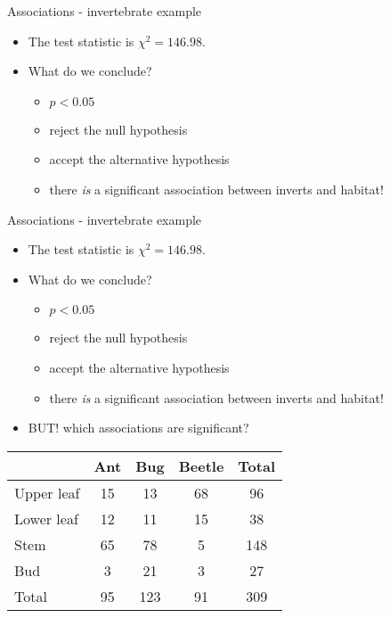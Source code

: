 \documentclass[
  ignorenonframetext,
  t]{beamer}
\providecommand{\tightlist}{%
  \setlength{\itemsep}{0pt}\setlength{\parskip}{0pt}}
\begin{document}
\begin{frame}{Associations - invertebrate example}
\protect\hypertarget{associations---invertebrate-example-7}{}

\begin{itemize}
\tightlist
\item
  The test statistic is \(\chi^2 = 146.98\).
\item
  What do we conclude?

  \begin{itemize}
  \tightlist
  \item
    \(p < 0.05\)
  \item
    reject the null hypothesis
  \item
    accept the alternative hypothesis
  \item
    there \emph{is} a significant association between inverts and
    habitat!
  \end{itemize}
\end{itemize}

\end{frame}

\begin{frame}{Associations - invertebrate example}
\protect\hypertarget{associations---invertebrate-example-8}{}

\begin{itemize}
\tightlist
\item
  The test statistic is \(\chi^2 = 146.98\).
\item
  What do we conclude?

  \begin{itemize}
  \tightlist
  \item
    \(p < 0.05\)
  \item
    reject the null hypothesis
  \item
    accept the alternative hypothesis
  \item
    there \emph{is} a significant association between inverts and
    habitat!
  \end{itemize}
\item
  BUT! which associations are significant?
\end{itemize}

\centering

\begin{tabular}{lcccc}
\toprule     
           & Ant & Bug  & Beetle & Total \\ \hline
Upper leaf & 15  &  13  & 68     &  96   \\   
Lower leaf & 12  &  11  & 15     &  38   \\   
Stem       & 65  &  78  &  5     & 148   \\   
Bud        &  3  &  21  &  3     &  27   \\ \hline    
Total      & 95  & 123  & 91     & 309   \\ \bottomrule    

\hline
\end{tabular}

\end{frame}
\end{document}
